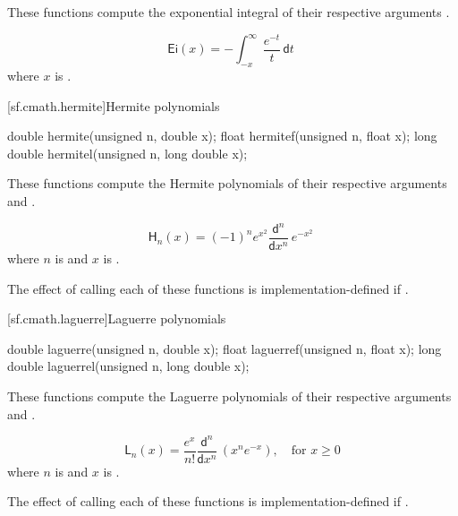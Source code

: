 \begin{itemdescr}

\pnum\effects
These functions compute the exponential integral
of their respective arguments
.

\pnum\returns
\[%
  \mathsf{Ei}(x) =
  - \int_{-x}^\infty \frac{e^{-t}}
                          {t     } \, \mathsf{d}t
\;
\]
where
$x$ is .

\end{itemdescr}

[sf.cmath.hermite]{Hermite polynomials}%
%
%
%
%
%
\begin{itemdecl}
double       hermite(unsigned n, double x);
float        hermitef(unsigned n, float x);
long double  hermitel(unsigned n, long double x);
\end{itemdecl}

\begin{itemdescr}
\pnum\effects
These functions compute the Hermite polynomials
of their respective arguments
 and .

\pnum\returns
\[%
  \mathsf{H}_n(x) =
  (-1)^n e^{x^2} \frac{ \mathsf{d} ^n}
		      { \mathsf{d}x^n} \, e^{-x^2}
\;
\]
where
$n$ is  and
$x$ is .

\pnum\remark
The effect of calling each of these functions
is implementation-defined
if .
\end{itemdescr}

[sf.cmath.laguerre]{Laguerre polynomials}%
%
%
%
%
%
\begin{itemdecl}
double       laguerre(unsigned n, double x);
float        laguerref(unsigned n, float x);
long double  laguerrel(unsigned n, long double x);
\end{itemdecl}

\begin{itemdescr}

\pnum\effects
These functions compute the Laguerre polynomials
of their respective arguments
 and .

\pnum\returns
\[%
  \mathsf{L}_n(x) =
  \frac{e^x}{n!} \frac{ \mathsf{d} ^ n}
		    { \mathsf{d}x ^ n} \, (x^n e^{-x}),
	   \quad \mbox{for $x \ge 0$}
\]
where
$n$ is  and
$x$ is .

\pnum\remark
The effect of calling each of these functions
is implementation-defined
if .
\end{itemdescr}

